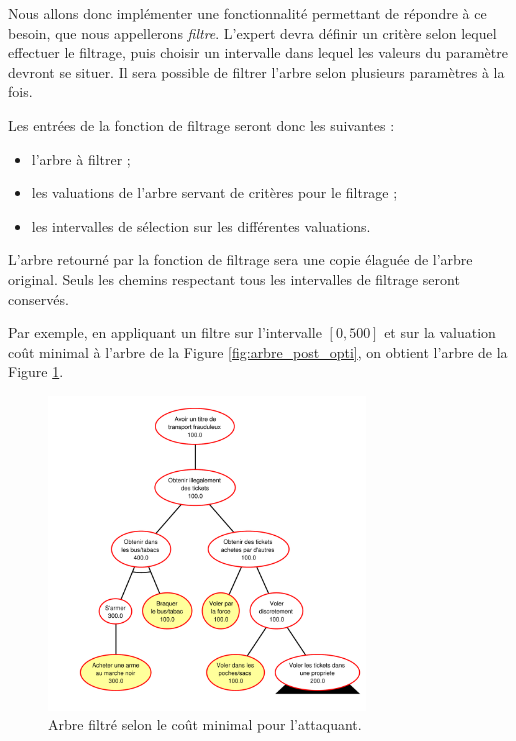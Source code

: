 		Nous allons donc implémenter une fonctionnalité permettant de répondre à ce besoin, que nous appellerons \textit{filtre}. L'expert devra définir un critère selon lequel effectuer le filtrage, puis choisir un intervalle dans lequel les valeurs du paramètre devront se situer. Il sera possible de filtrer l'arbre selon plusieurs paramètres à la fois.

		Les entrées de la fonction de filtrage seront donc les suivantes :
		\begin{itemize}
			\item l'arbre à filtrer ;
			\item les valuations de l'arbre servant de critères pour le filtrage ;
			\item les intervalles de sélection sur les différentes valuations.
		\end{itemize}
		
		L'arbre retourné par la fonction de filtrage sera une copie élaguée de l'arbre original. Seuls les chemins respectant tous les intervalles de filtrage seront conservés.

		Par exemple, en appliquant un filtre sur l'intervalle $[0, 500]$ et sur la valuation \og coût minimal \fg{} à l'arbre de la {\sc Figure} \ref{fig:arbre_post_opti}, on obtient l'arbre de la {\sc Figure} \ref{fig:arbre_post_filtre}.

		\begin{figure}[!h]
			\begin{center}
				\includegraphics[width=0.75\textwidth]{figure/post_filtre.pdf}
			\end{center}
			\caption{Arbre filtré selon le coût minimal pour l'attaquant.}
			\label{fig:arbre_post_filtre}
		\end{figure}

